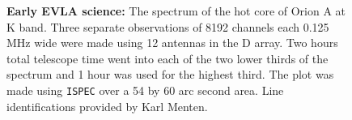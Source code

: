 
\vfill\eject

\begin{figure}[!ht]
\centering
\caption[Orion hot core at K band]{{\bf Early EVLA science:} The
spectrum of the hot core of Orion A at K band.  Three separate
observations of 8192 channels each 0.125 MHz wide were made using 12
antennas in the D array.  Two hours total telescope time went into
each of the two lower thirds of the spectrum and 1 hour was used for
the highest third.  The plot was made using {\tt ISPEC} over a 54 by
60 arc second area.  Line identifications provided by Karl
Menten.}
\label{fig:OrionKband}
\end{figure}


